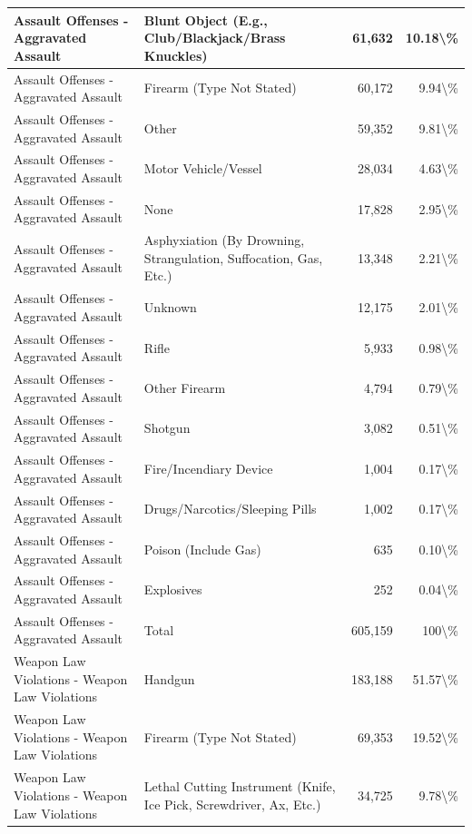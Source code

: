 \documentclass[
]{krantz}
\begin{document}
\begin{longtable}[t]{l|l|r|r}
\hline
Assault Offenses - Aggravated Assault & Blunt Object (E.g., Club/Blackjack/Brass Knuckles) & 61,632 & 10.18\textbackslash{}\%\\
\hline
Assault Offenses - Aggravated Assault & Firearm (Type Not Stated) & 60,172 & 9.94\textbackslash{}\%\\
\hline
Assault Offenses - Aggravated Assault & Other & 59,352 & 9.81\textbackslash{}\%\\
\hline
Assault Offenses - Aggravated Assault & Motor Vehicle/Vessel & 28,034 & 4.63\textbackslash{}\%\\
\hline
Assault Offenses - Aggravated Assault & None & 17,828 & 2.95\textbackslash{}\%\\
\hline
Assault Offenses - Aggravated Assault & Asphyxiation (By Drowning, Strangulation, Suffocation, Gas, Etc.) & 13,348 & 2.21\textbackslash{}\%\\
\hline
Assault Offenses - Aggravated Assault & Unknown & 12,175 & 2.01\textbackslash{}\%\\
\hline
Assault Offenses - Aggravated Assault & Rifle & 5,933 & 0.98\textbackslash{}\%\\
\hline
Assault Offenses - Aggravated Assault & Other Firearm & 4,794 & 0.79\textbackslash{}\%\\
\hline
Assault Offenses - Aggravated Assault & Shotgun & 3,082 & 0.51\textbackslash{}\%\\
\hline
Assault Offenses - Aggravated Assault & Fire/Incendiary Device & 1,004 & 0.17\textbackslash{}\%\\
\hline
Assault Offenses - Aggravated Assault & Drugs/Narcotics/Sleeping Pills & 1,002 & 0.17\textbackslash{}\%\\
\hline
Assault Offenses - Aggravated Assault & Poison (Include Gas) & 635 & 0.10\textbackslash{}\%\\
\hline
Assault Offenses - Aggravated Assault & Explosives & 252 & 0.04\textbackslash{}\%\\
\hline
Assault Offenses - Aggravated Assault & Total & 605,159 & 100\textbackslash{}\%\\
\hline
Weapon Law Violations - Weapon Law Violations & Handgun & 183,188 & 51.57\textbackslash{}\%\\
\hline
Weapon Law Violations - Weapon Law Violations & Firearm (Type Not Stated) & 69,353 & 19.52\textbackslash{}\%\\
\hline
Weapon Law Violations - Weapon Law Violations & Lethal Cutting Instrument (Knife, Ice Pick, Screwdriver, Ax, Etc.) & 34,725 & 9.78\textbackslash{}\%\\

\end{longtable}
\end{document}
